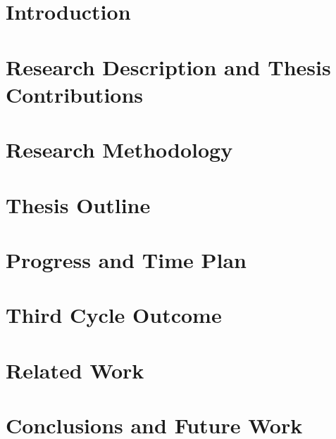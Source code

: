 \documentclass[10pt]{article}
\begin{document}
\newpage
\tableofcontents
\newpage

\section{Introduction}
\label{section:introduction}


\section{Research Description and Thesis Contributions}
\label{section:goals}


\section{Research Methodology}
\label{section:methods}


\section{Thesis Outline}
\label{section:outline}


\section{Progress and Time Plan}
\label{section:progress}


\section{Third Cycle Outcome}
\label{section:thirdcycle}



\section{Related Work}
\label{section:related}


\section{Conclusions and Future Work}
\label{section:conclusions}




\end{document}
